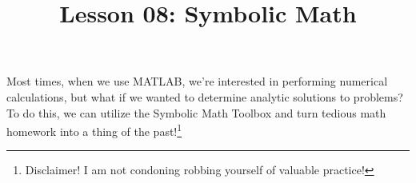 \documentclass{article}
\title{Lesson 08: Symbolic Math}
\begin{document}
\renderTitle

Most times, when we use MATLAB, we're interested in performing numerical
calculations, but what if we wanted to determine analytic solutions to
problems?  To do this, we can utilize the Symbolic Math Toolbox%
 and turn
tedious math homework into a thing of the past!\footnote{Disclaimer!
I am not condoning robbing yourself of valuable practice!}
\end{document}
